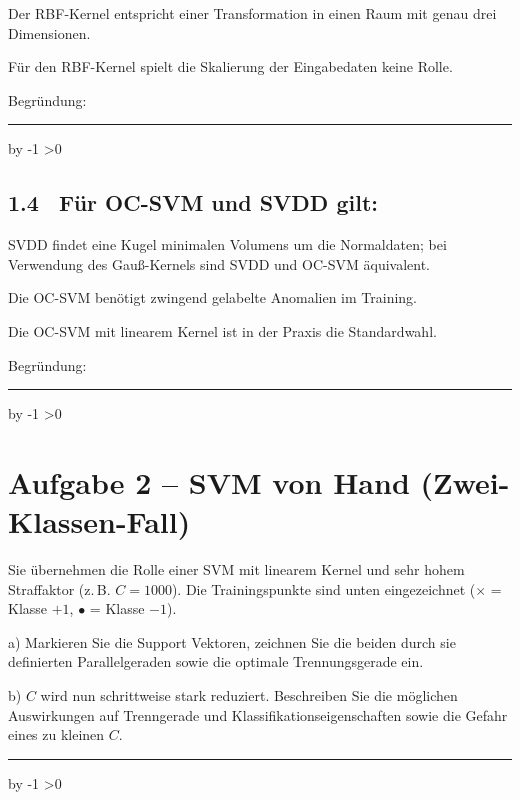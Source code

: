 \documentclass[10pt,a4paper]{article}
\newcommand{\mcbox}{\raisebox{-1pt}{\fbox{\rule{0pt}{7pt}\rule{7pt}{0pt}}}\hspace{6pt}}
\newcommand{\antwortlinien}[1]{%
  \par\vspace{2pt}%
  \newcount\zeilen \zeilen=#1
  \loop
    \noindent\rule{\linewidth}{0.4pt}\par\vspace{11pt}%
    \advance\zeilen by -1
  \ifnum\zeilen>0 \repeat
}
\begin{document}
\mcbox Der RBF-Kernel entspricht einer Transformation in einen Raum mit genau drei Dimensionen.

\mcbox Für den RBF-Kernel spielt die Skalierung der Eingabedaten keine Rolle.

Begründung:
\antwortlinien{2}

\subsection*{1.4 \ Für OC-SVM und SVDD gilt:}
\mcbox SVDD findet eine Kugel minimalen Volumens um die Normaldaten; bei Verwendung
des Gauß-Kernels sind SVDD und OC-SVM äquivalent.

\mcbox Die OC-SVM benötigt zwingend gelabelte Anomalien im Training.

\mcbox Die OC-SVM mit linearem Kernel ist in der Praxis die Standardwahl.

Begründung:
\antwortlinien{2}

\section*{Aufgabe 2 -- SVM von Hand (Zwei-Klassen-Fall)}

Sie übernehmen die Rolle einer SVM mit linearem Kernel und sehr hohem Straffaktor
(z.\,B. $C=1000$). Die Trainingspunkte sind unten eingezeichnet
($\times$ = Klasse $+1$, $\bullet$ = Klasse $-1$).

\begin{center}
\end{center}

a) Markieren Sie die Support Vektoren, zeichnen Sie die beiden durch sie definierten
Parallelgeraden sowie die optimale Trennungsgerade ein.

b) $C$ wird nun schrittweise stark reduziert. Beschreiben Sie die möglichen Auswirkungen
auf Trenngerade und Klassifikationseigenschaften sowie die Gefahr eines zu kleinen $C$.
\antwortlinien{4}
\end{document}
